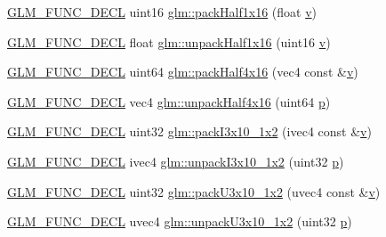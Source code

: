 \begin{DoxyCompactItemize}
\item 
\mbox{\hyperlink{setup_8hpp_ab2d052de21a70539923e9bcbf6e83a51}{G\+L\+M\+\_\+\+F\+U\+N\+C\+\_\+\+D\+E\+CL}} uint16 \mbox{\hyperlink{group__gtc__packing_gaba534b320836a35372e00af5771dd1a2}{glm\+::pack\+Half1x16}} (float \mbox{\hyperlink{_s_d_l__opengl_8h_a10a82eabcb59d2fcd74acee063775f90}{v}})
\item 
\mbox{\hyperlink{setup_8hpp_ab2d052de21a70539923e9bcbf6e83a51}{G\+L\+M\+\_\+\+F\+U\+N\+C\+\_\+\+D\+E\+CL}} float \mbox{\hyperlink{group__gtc__packing_gaa6eebcdfc746584b7d1823f1d5344fed}{glm\+::unpack\+Half1x16}} (uint16 \mbox{\hyperlink{_s_d_l__opengl_8h_a10a82eabcb59d2fcd74acee063775f90}{v}})
\item 
\mbox{\hyperlink{setup_8hpp_ab2d052de21a70539923e9bcbf6e83a51}{G\+L\+M\+\_\+\+F\+U\+N\+C\+\_\+\+D\+E\+CL}} uint64 \mbox{\hyperlink{group__gtc__packing_ga8104f0b719b7792491f2b789a6dd6f96}{glm\+::pack\+Half4x16}} (vec4 const \&\mbox{\hyperlink{_s_d_l__opengl_8h_a10a82eabcb59d2fcd74acee063775f90}{v}})
\item 
\mbox{\hyperlink{setup_8hpp_ab2d052de21a70539923e9bcbf6e83a51}{G\+L\+M\+\_\+\+F\+U\+N\+C\+\_\+\+D\+E\+CL}} vec4 \mbox{\hyperlink{group__gtc__packing_gaea526d6491ad40401eac34803984bf27}{glm\+::unpack\+Half4x16}} (uint64 \mbox{\hyperlink{_s_d_l__opengl__glext_8h_aa5367c14d90f462230c2611b81b41d23}{p}})
\item 
\mbox{\hyperlink{setup_8hpp_ab2d052de21a70539923e9bcbf6e83a51}{G\+L\+M\+\_\+\+F\+U\+N\+C\+\_\+\+D\+E\+CL}} uint32 \mbox{\hyperlink{group__gtc__packing_ga032e18fa5bc5b8f3897104aeb2f1e195}{glm\+::pack\+I3x10\+\_\+1x2}} (ivec4 const \&\mbox{\hyperlink{_s_d_l__opengl_8h_a10a82eabcb59d2fcd74acee063775f90}{v}})
\item 
\mbox{\hyperlink{setup_8hpp_ab2d052de21a70539923e9bcbf6e83a51}{G\+L\+M\+\_\+\+F\+U\+N\+C\+\_\+\+D\+E\+CL}} ivec4 \mbox{\hyperlink{group__gtc__packing_ga08bcd34cf9c34701d658dd861ee6e300}{glm\+::unpack\+I3x10\+\_\+1x2}} (uint32 \mbox{\hyperlink{_s_d_l__opengl__glext_8h_aa5367c14d90f462230c2611b81b41d23}{p}})
\item 
\mbox{\hyperlink{setup_8hpp_ab2d052de21a70539923e9bcbf6e83a51}{G\+L\+M\+\_\+\+F\+U\+N\+C\+\_\+\+D\+E\+CL}} uint32 \mbox{\hyperlink{group__gtc__packing_gaf656d8862628f96b20de7a36eaa1fe56}{glm\+::pack\+U3x10\+\_\+1x2}} (uvec4 const \&\mbox{\hyperlink{_s_d_l__opengl_8h_a10a82eabcb59d2fcd74acee063775f90}{v}})
\item 
\mbox{\hyperlink{setup_8hpp_ab2d052de21a70539923e9bcbf6e83a51}{G\+L\+M\+\_\+\+F\+U\+N\+C\+\_\+\+D\+E\+CL}} uvec4 \mbox{\hyperlink{group__gtc__packing_ga119aa2d7d55952f9dc4214390a6ffefc}{glm\+::unpack\+U3x10\+\_\+1x2}} (uint32 \mbox{\hyperlink{_s_d_l__opengl__glext_8h_aa5367c14d90f462230c2611b81b41d23}{p}})

\end{DoxyCompactItemize}
